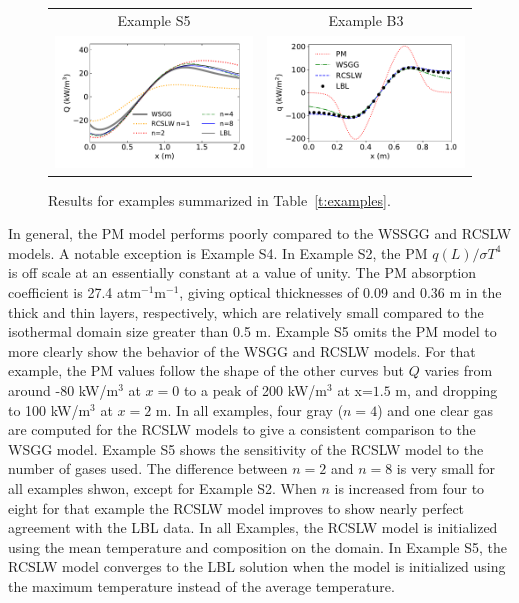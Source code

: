 \documentclass[preprint,12pt]{elsarticle}
\begin{document}
\begin{figure}
\begin{center}
\begin{tabular}{c c}
        Example S5 & Example B3 \\
        \includegraphics[width=2.75 in]{fig_ex_5b.pdf} &
        \includegraphics[width=2.75 in]{fig_ex_6.pdf}
    \end{tabular}
    \caption{Results for examples summarized in Table~\ref{t:examples}.}
    \label{f:examples}
    \end{center}
\end{figure}
%
In general, the PM model performs poorly compared to the WSSGG and RCSLW models. A notable exception is Example S4. In Example S2, the PM $q(L)/\sigma T^4$ is off scale at an essentially constant at a value of unity. The PM absorption coefficient is 27.4 atm$^{-1}$m$^{-1}$, giving optical thicknesses of 0.09 and 0.36 m in the thick and thin layers, respectively, which are relatively small compared to the isothermal domain size greater than 0.5 m. Example S5 omits the PM model to more clearly show the behavior of the WSGG and RCSLW models. For that example, the PM values follow the shape of the other curves but $Q$ varies from around -80 kW/m$^3$ at $x=0$ to a peak of 200 kW/m$^3$ at x=$1.5$ m, and dropping to 100 kW/m$^3$ at $x=2$ m. In all examples, four gray ($n=4$) and one clear gas are computed for the RCSLW models to give a consistent comparison to the WSGG model. Example S5 shows the sensitivity of the RCSLW model to the number of gases used. The difference between $n=2$ and $n=8$ is very small for all examples shwon, except for Example S2. When $n$ is increased from four to eight for that example the RCSLW model improves to show nearly perfect agreement with the LBL data.
In all Examples, the RCSLW model is initialized using the mean temperature and composition on the domain. In Example S5, the RCSLW model converges to the LBL solution when the model is initialized using the maximum temperature instead of the average temperature.
\end{document}
